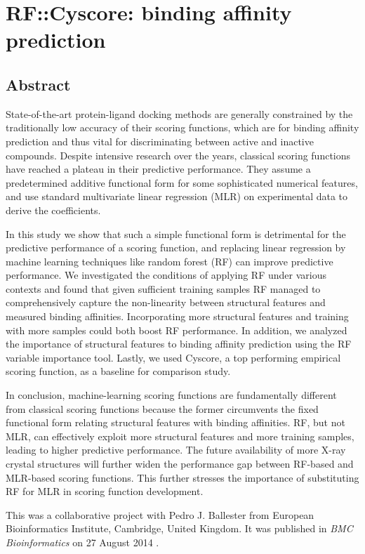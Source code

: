 \chapter{RF::Cyscore: binding affinity prediction}

\section{Abstract}

State-of-the-art protein-ligand docking methods are generally constrained by the traditionally low accuracy of their scoring functions, which are for binding affinity prediction and thus vital for discriminating between active and inactive compounds. Despite intensive research over the years, classical scoring functions have reached a plateau in their predictive performance. They assume a predetermined additive functional form for some sophisticated numerical features, and use standard multivariate linear regression (MLR) on experimental data to derive the coefficients.

In this study we show that such a simple functional form is detrimental for the predictive performance of a scoring function, and replacing linear regression by machine learning techniques like random forest (RF) can improve predictive performance. We investigated the conditions of applying RF under various contexts and found that given sufficient training samples RF managed to comprehensively capture the non-linearity between structural features and measured binding affinities. Incorporating more structural features and training with more samples could both boost RF performance. In addition, we analyzed the importance of structural features to binding affinity prediction using the RF variable importance tool. Lastly, we used Cyscore, a top performing empirical scoring function, as a baseline for comparison study.

In conclusion, machine-learning scoring functions are fundamentally different from classical scoring functions because the former circumvents the fixed functional form relating structural features with binding affinities. RF, but not MLR, can effectively exploit more structural features and more training samples, leading to higher predictive performance. The future availability of more X-ray crystal structures will further widen the performance gap between RF-based and MLR-based scoring functions. This further stresses the importance of substituting RF for MLR in scoring function development.

This was a collaborative project with Pedro J. Ballester from European Bioinformatics Institute, Cambridge, United Kingdom. It was published in \textit{BMC Bioinformatics} on 27 August 2014 \citep{1432}.

